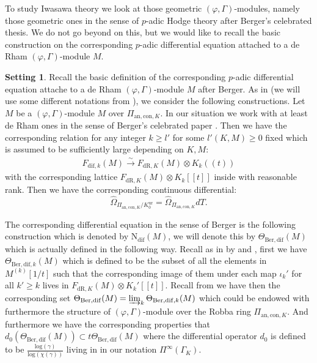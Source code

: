 \documentclass[12pt]{amsart}
\theoremstyle{definition}
\numberwithin{equation}{section}
\newtheorem{setting}[theorem]{Setting}
\begin{document}
\indent To study Iwasawa theory we look at those geometric $(\varphi,\Gamma)$-modules, namely those geometric ones in the sense of $p$-adic Hodge theory after Berger's celebrated thesis. We do not go beyond \cite{Nakamura1} on this, but we would like to recall the basic construction on the corresponding $p$-adic differential equation attached to a de Rham $(\varphi,\Gamma)$-module $M$.

\begin{setting}
Recall the basic definition of the corresponding $p$-adic differential equation attache to a de Rham $(\varphi,\Gamma)$-module $M$ after Berger. As in \cite[Section 3.2]{Nakamura1} (we will use some different notations from \cite[Section 3.2]{Nakamura1}), we consider the following constructions. Let $M$ be a $(\varphi,\Gamma)$-module $M$ over $\Pi_{\mathrm{an,con},K}$. In our situation we work with at least de Rham ones in the sense of Berger's celebrated paper \cite{Ber1}. Then we have the corresponding relation for any integer $k\geq l'$ for some $l'(K,M)\geq 0$ fixed which is assumed to be sufficiently large depending on $K,M$:
\begin{align}
F_{\mathrm{dif},k}(M)\overset{\sim}{\longrightarrow} F_{\mathrm{dR},K}(M)\otimes K_k((t))	
\end{align}
with the corresponding lattice $F_{\mathrm{dR},K}(M)\otimes K_k[[t]]$ inside with reasonable rank. Then we have the corresponding continuous differential:
\begin{displaymath}
\widehat{\Omega}_{\Pi_{\mathrm{an,con},K}/K_0^\mathrm{ur}}=	\widehat{\Omega}_{\Pi_{\mathrm{an,con},K}}dT.
\end{displaymath}
 
\end{setting}



The corresponding differential equation in the sense of Berger is the following construction which is denoted by $\mathrm{N}_{\mathrm{dif}}(M)$, we will denote this by $\Theta_{\mathrm{Ber,dif}}(M)$ which is actually defined in the following way. Recall as in \cite[Theorem 3.5]{Nakamura1} by \cite[5.10]{Ber1} and \cite[3.2.3]{Ber2}, first we have $\Theta_{\mathrm{Ber,dif},k}(M)$ which is defined to be the subset of all the elements in $M^{(k)}[1/t]$ such that the corresponding image of them under each map $\iota_k'$ for all $k'\geq k$ lives in $F_{\mathrm{dR},K}(M)\otimes K_k'[[t]]$. Recall from \cite[Section 3.2]{Nakamura1} we have then the corresponding set $\Theta_{\mathrm{Ber,dif}}(M)=\varinjlim_k \Theta_{\mathrm{Ber,dif},k}(M)$ which could be endowed with furthermore the structure of $(\varphi,\Gamma)$-module over the Robba ring $\Pi_{\mathrm{an,con},K}$. And furthermore we have the corresponding properties that $d_0(\Theta_{\mathrm{Ber,dif}}(M))\subset t\Theta_{\mathrm{Ber,dif}}(M)$ where the differential operator $d_0$ is defined to be $\frac{\mathrm{log}(\gamma)}{\mathrm{log}(\chi(\gamma))}$ living in in our notation $\Pi^\infty(\Gamma_K)$.\\
\end{document}
